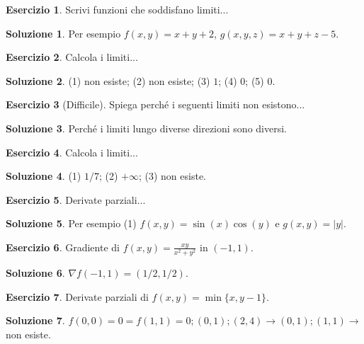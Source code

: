 \documentclass[12pt,a4paper]{article}
\theoremstyle{definition}
\newtheorem{exe}{Esercizio}
\newtheorem*{sol}{Soluzione}
\begin{document}
\begin{exe}
    Scrivi funzioni che soddisfano limiti...
\end{exe}
\begin{sol}
    Per esempio $f(x,y) = x+y+2$, $g(x,y,z) = x+y+z-5$.
\end{sol}

\begin{exe}
    Calcola i limiti...
\end{exe}
\begin{sol}
    (1) non esiste; (2) non esiste; (3) $1$; (4) $0$; (5) $0$.
\end{sol}

\begin{exe}[Difficile]
    Spiega perché i seguenti limiti non esistono...
\end{exe}
\begin{sol}
    Perché i limiti lungo diverse direzioni sono diversi.
\end{sol}

\begin{exe}
    Calcola i limiti...
\end{exe}
\begin{sol}
    (1) $1/7$; (2) $+\infty$; (3) non esiste.
\end{sol}

\begin{exe}
    Derivate parziali...
\end{exe}
\begin{sol}
    Per esempio (1) $f(x,y) = \sin(x) \cos(y)$ e $g(x,y) = |y|$.
\end{sol}

\begin{exe}
    Gradiente di $f(x,y) = \frac{xy}{x^2+y^2}$ in $(-1,1)$.
\end{exe}
\begin{sol}
    $\nabla f(-1,1) = (1/2, 1/2)$.
\end{sol}

\begin{exe}
    Derivate parziali di $f(x,y) = \min\{x, y-1\}$.
\end{exe}
\begin{sol}
    $f(0,0)=0 = f(1,1)=0; (0,1); (2,4) \to (0,1); (1,1) \to$ non esiste.
\end{sol}
\end{document}
